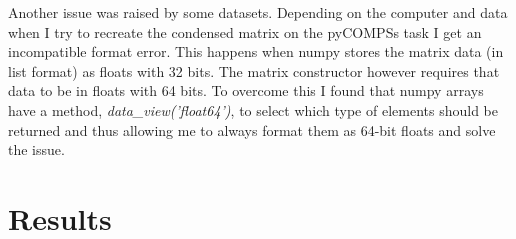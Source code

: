 Another issue was raised by some datasets. Depending on the computer and data when I try to recreate the condensed matrix on the pyCOMPSs task I get an incompatible format error. This happens when numpy stores the matrix data (in list format) as floats with 32 bits. The matrix constructor however requires that data to be in floats with 64 bits. To overcome this I found that numpy arrays have a method, \textit{data\_view('float64')}, to select which type of elements should be returned and thus allowing me to always format them as 64-bit floats and solve the issue.


\section{Results}





